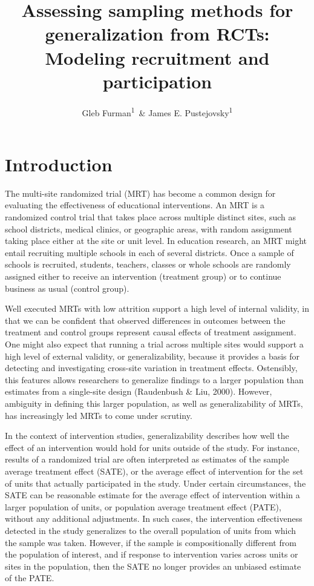 \documentclass[
  english,
  man,floatsintext]{apa6}
\author{Gleb Furman\textsuperscript{1}\ \& James E. Pustejovsky\textsuperscript{1}}
\affiliation{
\vspace{0.5cm}
\textsuperscript{1} University of Texas at Austin}
\title{Assessing sampling methods for generalization from RCTs: Modeling recruitment and participation}
\date{}
\begin{document}
\maketitle

\hypertarget{introduction}{%
\section{Introduction}\label{introduction}}

The multi-site randomized trial (MRT) has become a common design for evaluating the effectiveness of educational interventions. An MRT is a randomized control trial that takes place across multiple distinct sites, such as school districts, medical clinics, or geographic areas, with random assignment taking place either at the site or unit level. In education research, an MRT might entail recruiting multiple schools in each of several districts. Once a sample of schools is recruited, students, teachers, classes or whole schools are randomly assigned either to receive an intervention (treatment group) or to continue business as usual (control group).

Well executed MRTs with low attrition support a high level of internal validity, in that we can be confident that observed differences in outcomes between the treatment and control groups represent causal effects of treatment assignment. One might also expect that running a trial across multiple sites would support a high level of external validity, or generalizability, because it provides a basis for detecting and investigating cross-site variation in treatment effects.
Ostensibly, this features allows researchers to generalize findings to a larger population than estimates from a single-site design (Raudenbush \& Liu, 2000). However, ambiguity in defining this larger population, as well as generalizability of MRTs, has increasingly led MRTs to come under scrutiny.

In the context of intervention studies, generalizability describes how well the effect of an intervention would hold for units outside of the study.
For instance, results of a randomized trial are often interpreted as estimates of the sample average treatment effect (SATE), or the average effect of intervention for the set of units that actually participated in the study.
Under certain circumstances, the SATE can be reasonable estimate for the average effect of intervention within a larger population of units, or population average treatment effect (PATE), without any additional adjustments. In such cases, the intervention effectiveness detected in the study generalizes to the overall population of units from which the sample was taken. However, if the sample is compositionally different from the population of interest, and if response to intervention varies across units or sites in the population, then the SATE no longer provides an unbiased estimate of the PATE.
\end{document}
